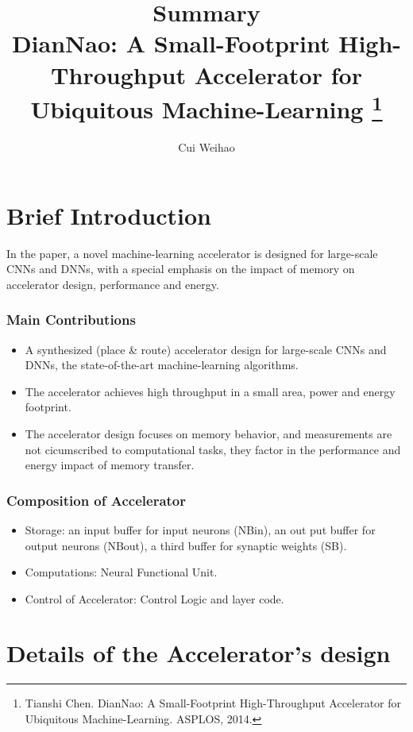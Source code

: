 \documentclass[10pt]{article}
\title{{\Huge Summary}\\{\Large{DianNao: A Small-Footprint
High-Throughput Accelerator for Ubiquitous Machine-Learning
\footnote{Tianshi Chen. DianNao: A Small-Footprint
High-Throughput Accelerator for Ubiquitous Machine-Learning.
ASPLOS, 2014.}}}}
\author{Cui Weihao}
\affiliation{SJTU}
\begin{document}
    \maketitle
    \flushbottom
    \newpage
    \pagestyle{fancynotes}
    \part{Brief Introduction}
    In the paper, a novel machine-learning accelerator is designed for
    large-scale CNNs and DNNs, with a special emphasis on the impact
    of memory on accelerator design, performance and energy.
    \section{Main Contributions}
    \begin{itemize}
        \item A synthesized (place \& route) accelerator design for
        large-scale CNNs and DNNs, the state-of-the-art
        machine-learning algorithms.
        \item The accelerator achieves high throughput in a small area,
        power and energy footprint.
        \item The accelerator design focuses on memory behavior, and
        measurements are not cicumscribed to computational tasks, they
        factor in the performance and energy impact of memory transfer.
    \end{itemize}
    \section{Composition of Accelerator}
    \begin{itemize}
        \item Storage: an input buffer for input neurons (NBin), an out
        put buffer for output neurons (NBout), a third buffer for
        synaptic weights (SB).
        \item Computations: Neural Functional Unit.
        \item Control of Accelerator: Control Logic and  layer code.
    \end{itemize}
    \newpage
    \pagestyle{fancynotes}
    \part{Details of the Accelerator's design}
\end{document}
